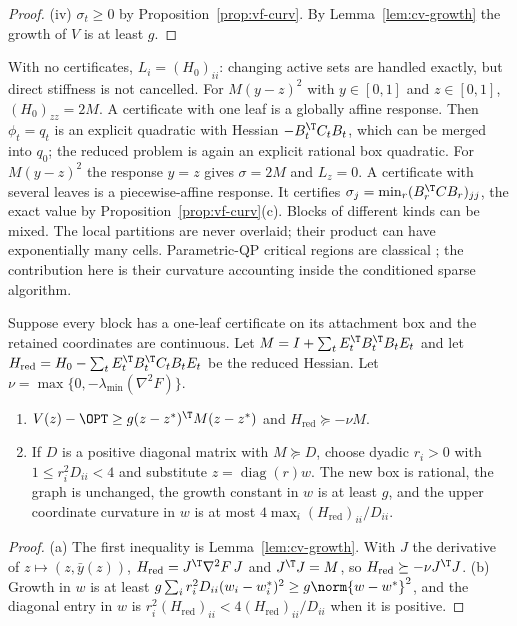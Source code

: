 \begin{proof}
(iv) $\sigma_t\ge0$ by Proposition~\ref{prop:vf-curv}. By
Lemma~\ref{lem:cv-growth} the growth of $V$ is at least $g$.
\end{proof}

\begin{remark}\label{rem:cv-instances}
With no certificates, $L_i=(H_0)_{ii}$: changing active sets are handled
exactly, but direct stiffness is not cancelled. For $M(y-z)^2$ with
$y\in[0,1]$ and $z\in[0,1]$, $(H_0)_{zz}=2M$. A certificate with one leaf is
a globally affine response. Then $\phi_t=q_t$ is an explicit quadratic with
Hessian $-B_t^{\T}C_tB_t$, which can be merged into $q_0$; the reduced
problem is again an explicit rational box quadratic. For $M(y-z)^2$ the
response $y=z$ gives $\sigma=2M$ and $L_z=0$. A certificate with several
leaves is a piecewise-affine response. It certifies
$\sigma_j=\min_r(B_r^{\T}CB_r)_{jj}$, the exact value by
Proposition~\ref{prop:vf-curv}(c). Blocks of different kinds can be mixed. The
local partitions are never overlaid; their product can have exponentially many
cells. Parametric-QP critical regions are classical
\cite{BemporadEtAl2002}; the contribution here is their curvature accounting
inside the conditioned sparse algorithm.
\end{remark}

\begin{corollary}\label{cor:cv-affine}
Suppose every block has a one-leaf certificate on its attachment box and the
retained coordinates are continuous. Let
$M=I+\sum_tE_t^{\T}B_t^{\T}B_tE_t$ and let
$H_{\mathrm{red}}=H_0-\sum_tE_t^{\T}B_t^{\T}C_tB_tE_t$ be the reduced
Hessian. Let $\nu=\max\{0,-\lambda_{\min}(\nabla^2F)\}$.
\begin{enumerate}
\item[(a)] $V(z)-\OPT\ge g(z-z^*)^{\T}M(z-z^*)$ and
$H_{\mathrm{red}}\succeq-\nu M$.
\item[(b)] If $D$ is a positive diagonal matrix with $M\succeq D$, choose dyadic
$r_i>0$ with $1\le r_i^2D_{ii}<4$ and substitute $z=\operatorname{diag}(r)w$.
The new box is rational, the graph is unchanged, the growth constant in $w$ is
at least $g$, and the upper coordinate curvature in $w$ is at most
$4\max_i(H_{\mathrm{red}})_{ii}/D_{ii}$.
\end{enumerate}
\end{corollary}

\begin{proof}
(a) The first inequality is Lemma~\ref{lem:cv-growth}. With $J$ the derivative
of $z\mapsto(z,\bar y(z))$, $H_{\mathrm{red}}=J^{\T}\nabla^2F\,J$ and
$J^{\T}J=M$, so $H_{\mathrm{red}}\succeq-\nu J^{\T}J$. (b) Growth in
$w$ is at least
$g\sum_ir_i^2D_{ii}(w_i-w_i^*)^2\ge g\norm{w-w^*}^2$, and the diagonal entry
in $w$ is $r_i^2(H_{\mathrm{red}})_{ii}<4(H_{\mathrm{red}})_{ii}/D_{ii}$ when it is
positive.
\end{proof}

